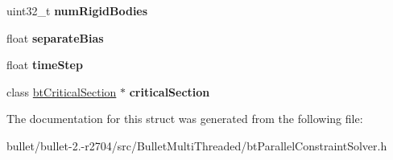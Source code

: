 \begin{DoxyCompactItemize}
\item 
\hypertarget{struct_pfx_setup_contact_constraints_i_o_a62ba0c0b36ec884c15a7f86d0f8b7fb4}{uint32\+\_\+t {\bfseries num\+Rigid\+Bodies}}\label{struct_pfx_setup_contact_constraints_i_o_a62ba0c0b36ec884c15a7f86d0f8b7fb4}

\item 
\hypertarget{struct_pfx_setup_contact_constraints_i_o_a0f08b86e03bcc7a243db01a2f7903fa4}{float {\bfseries separate\+Bias}}\label{struct_pfx_setup_contact_constraints_i_o_a0f08b86e03bcc7a243db01a2f7903fa4}

\item 
\hypertarget{struct_pfx_setup_contact_constraints_i_o_acf7c9c42c6ff961bf0c42c3601f4c21c}{float {\bfseries time\+Step}}\label{struct_pfx_setup_contact_constraints_i_o_acf7c9c42c6ff961bf0c42c3601f4c21c}

\item 
\hypertarget{struct_pfx_setup_contact_constraints_i_o_a217b8c17fc0a4422925cea6921c6e3fd}{class \hyperlink{classbt_critical_section}{bt\+Critical\+Section} $\ast$ {\bfseries critical\+Section}}\label{struct_pfx_setup_contact_constraints_i_o_a217b8c17fc0a4422925cea6921c6e3fd}

\end{DoxyCompactItemize}


The documentation for this struct was generated from the following file\+:\begin{DoxyCompactItemize}
\item 
bullet/bullet-\/2.-\/r2704/src/\+Bullet\+Multi\+Threaded/bt\+Parallel\+Constraint\+Solver.\+h\end{DoxyCompactItemize}

